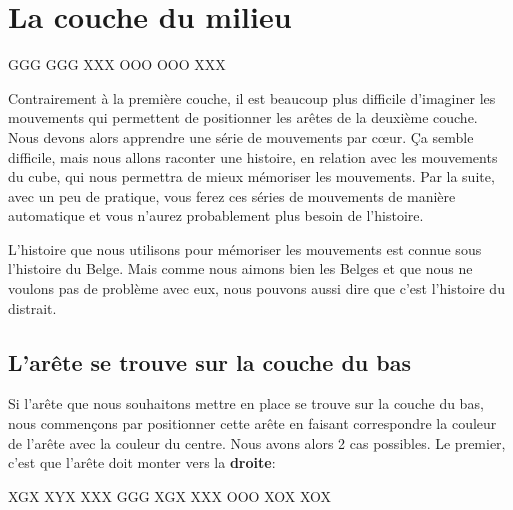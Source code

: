 \chapter{La couche du milieu}

{
	\centering
	\RubikFaceRight%
	{G}{G}{G}%
	{G}{G}{G}%
	{X}{X}{X}
	\RubikFaceFront%
	{O}{O}{O}%
	{O}{O}{O}%
	{X}{X}{X}
	\par
}
\medskip

Contrairement à la première couche, il est beaucoup plus difficile d'imaginer les mouvements qui permettent de positionner les arêtes de la deuxième couche. Nous devons alors apprendre une série de mouvements par cœur. Ça semble difficile, mais nous allons raconter une histoire, en relation avec les mouvements du cube, qui nous permettra de mieux mémoriser les mouvements. Par la suite, avec un peu de pratique, vous ferez ces séries de mouvements de manière automatique et vous n'aurez probablement plus besoin de l'histoire.  

L'histoire que nous utilisons pour mémoriser les mouvements est connue sous \og{}l'histoire du Belge\fg{}. Mais comme nous aimons bien les Belges et que nous ne voulons pas de problème avec eux, nous pouvons aussi dire que c'est \og{}l'histoire du distrait\fg{}.

\section{L'arête se trouve sur la couche du bas}\label{subsec:c21}

Si l'arête que nous souhaitons mettre en place se trouve sur la couche du bas, nous commençons par positionner cette arête en faisant correspondre la couleur de l'arête avec la couleur du centre. Nous avons alors 2 cas possibles. Le premier, c'est que l'arête doit \og{}monter\fg{} vers la \textbf{droite}:
\smallskip

\begin{center}
	\RubikFaceDown%
	{X}{G}{X}%
	{X}{Y}{X}%
	{X}{X}{X}
	\RubikFaceRight%
	{G}{G}{G}%
	{X}{G}{X}%
	{X}{X}{X}
	\RubikFaceFront%
	{O}{O}{O}%
	{X}{O}{X}%
	{X}{O}{X}
\end{center}
\smallskip

